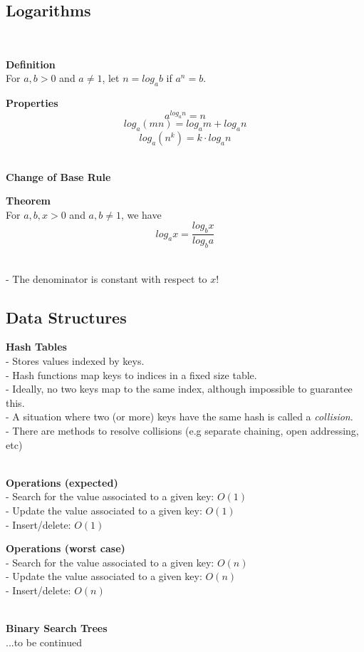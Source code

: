 \documentclass{article}
\begin{document}
\subsection{Logarithms}
\\
\begin{tcolorbox}
    \textbf{Definition} \\
    For $a, b > 0$ and $a \neq 1$, let $n = log_{a}b$ if $a^{n} = b$.
\end{tcolorbox}
\begin{tcolorbox}
    \textbf{Properties} \\
    $$a^{log_{a}n} = n$$
    $$log_{a}(mn) = log_{a}m + log_{a}n$$
    $$log_{a}(n^{k}) = k \cdot log_{a}n$$
\end{tcolorbox}
~\\
\textbf{Change of Base Rule}
\\
\begin{tcolorbox}
    \textbf{Theorem} \\
    For $a, b, x > 0$ and $a, b \neq 1$, we have
    $$log_{a}x = \frac{log_{b}x}{log_{b}a}$$
\end{tcolorbox}
~\\
- The denominator is constant with respect to $x!$ \\
\subsection{Data Structures}
\textbf{Hash Tables} \\
- Stores values indexed by keys. \\
- Hash functions map keys to indices in a fixed size table. \\
- Ideally, no two keys map to the same index, although impossible to guarantee this. \\
- A situation where two (or more) keys have the same hash is called a \emph{collision}. \\
- There are methods to resolve collisions (e.g separate chaining, open addressing, etc)
\\\\
\begin{tcolorbox}
    \textbf{Operations (expected)} \\
    - Search for the value associated to a given key: $O(1)$ \\
    - Update the value associated to a given key: $O(1)$ \\
    - Insert/delete: $O(1)$
\end{tcolorbox}
\begin{tcolorbox}
\textbf{Operations (worst case)} \\
    - Search for the value associated to a given key: $O(n)$ \\
    - Update the value associated to a given key: $O(n)$ \\
    - Insert/delete: $O(n)$
\end{tcolorbox}
~\\
\textbf{Binary Search Trees} \\
...to be continued
\end{document}
